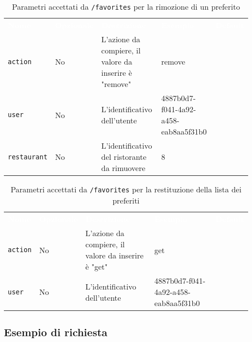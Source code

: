\begin{table}[!htbp]
\renewcommand{\arraystretch}{1.5}
\begin{tabular}[t]{ m{}<{\centering}  m{}<{\centering} m{}<{\centering} m{}<{\centering}  m{}<{\centering} }
	\rowcolor{darkblue}
	\textcolor{white}{\textbf{Nome}} &\textcolor{white}{\textbf{Opzionale}} &\textcolor{white}{\textbf{Descrizione}} &\textcolor{white}{\textbf{Esempio}} &\textcolor{white}{\textbf{Default}} \\ 
\texttt{action} & No & L'azione da compiere, il valore da inserire è "remove"  & remove &  \\
\texttt{user} & No & L'identificativo dell'utente  & 4887b0d7-f041-4a92-a458-eab8aa5f31b0 &  \\
\texttt{restaurant} & No & L'identificativo del ristorante da rimuovere  & 8 &  \\
\end{tabular}
\caption{Parametri accettati da \texttt{/favorites} per la rimozione di un preferito}
\end{table}

\pagebreak

\begin{table}[!htbp]
\renewcommand{\arraystretch}{1.5}
\begin{tabular}[t]{ m{}<{\centering}  m{}<{\centering} m{}<{\centering} m{}<{\centering}  m{}<{\centering} }
	\rowcolor{darkblue}
	\textcolor{white}{\textbf{Nome}} &\textcolor{white}{\textbf{Opzionale}} &\textcolor{white}{\textbf{Descrizione}} &\textcolor{white}{\textbf{Esempio}} &\textcolor{white}{\textbf{Default}} \\ 
\texttt{action} & No & L'azione da compiere, il valore da inserire è "get"  & get &  \\
\texttt{user} & No & L'identificativo dell'utente  & 4887b0d7-f041-4a92-a458-eab8aa5f31b0 &  \\

\end{tabular}
\caption{Parametri accettati da \texttt{/favorites} per la restituzione della lista dei preferiti}
\end{table}

\subsection{Esempio di richiesta}
